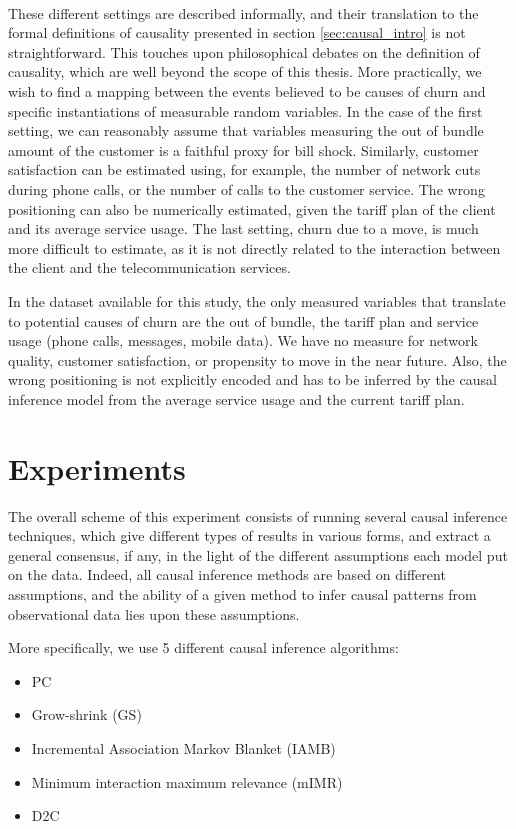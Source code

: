\paragraph{} These different settings are described informally, and their
translation to the formal definitions of causality presented in section
\ref{sec:causal_intro} is not straightforward. This touches upon philosophical
debates on the definition of causality, which are well beyond the scope of this
thesis. More practically, we wish to find a mapping between the events believed
to be causes of churn and specific instantiations of measurable random
variables. In the case of the first setting, we can reasonably assume that
variables measuring the out of bundle amount of the customer is a faithful proxy
for bill shock.  Similarly, customer satisfaction can be estimated using,
for example, the number of network cuts during phone calls, or the number of
calls to the customer service. The wrong positioning can also be numerically
estimated, given the tariff plan of the client and its average service usage.
The last setting, churn due to a move, is much more difficult to estimate, as it
is not directly related to the interaction between the client and the
telecommunication services.

In the dataset available for this study, the only measured variables that
translate to potential causes of churn are the out of bundle, the tariff plan
and service usage (phone calls, messages, mobile data). We have no measure
for network quality, customer satisfaction, or propensity to move in the near
future. Also, the wrong positioning is not explicitly encoded and has to be
inferred by the causal inference model from the average service usage and the
current tariff plan.

\section{Experiments}
\label{sec:causal_experiments}

The overall scheme of this experiment consists of running several causal
inference techniques, which give different types of results in various forms,
and extract a general consensus, if any, in the light of the different
assumptions each model put on the data. Indeed, all causal inference methods are
based on different assumptions, and the ability of a given method to infer
causal patterns from observational data lies upon these assumptions.

More specifically, we use 5 different causal inference algorithms:
\noprelistbreak
\begin{itemize}
    \item PC
	\item Grow-shrink (GS)
	\item Incremental Association Markov Blanket (IAMB)
	\item Minimum interaction maximum relevance (mIMR)
	\item D2C
\end{itemize}

